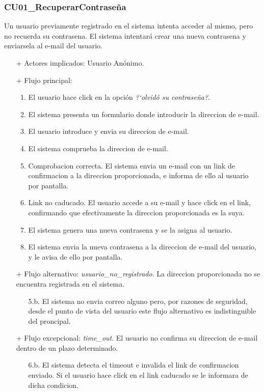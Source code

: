 \documentclass[a4paper]{report}
\begin{document}
            \subsubsection{CU01\_RecuperarContrase\~na}
                Un usuario previamente registrado en el sistema intenta acceder al mismo, pero no recuerda su contrasena. El sistema intentar\'a crear una nueva contrasena y enviarsela al e-mail del usuario.
                \begin{itemize}
                    \item[+] Actores implicados: Usuario An\'onimo.
                    \item[+] Flujo principal:
                    \begin{enumerate}
                        \item El usuario hace click en la opci\'on \emph{?`olvid\'o su contrase\~na?}.
                        \item El sistema presenta un formulario donde introducir la direccion de e-mail.
                        \item El usuario introduce y envia su direccion de e-mail.
                        \item El sistema comprueba la direccion de e-mail.
                        \item Comprobacion correcta. El sistema envia un e-mail con un link de confirmacion a la direccion proporcionada, e informa de ello al usuario por pantalla.
                        \item Link no caducado. El usuario accede a su e-mail y hace click en el link, confirmando que efectivamente la direccion proporcionada es la suya.
                        \item El sistema genera una nueva contrasena y se la asigna al usuario.
                        \item El sistema envia la nueva contrasena a la direccion de e-mail del usuario, y le avisa de ello por pantalla.
                    \end{enumerate}
                    \item[+] Flujo alternativo: \emph{usuario\_no\_registrado}. La direccion proporcionada no se encuentra registrada en el sistema.
                    \begin{itemize}
                        \item[5.b.] El sistema no envia correo alguno pero, por razones de seguridad, desde el punto de vista del usuario este flujo alternativo es indistinguible del proncipal.
                    \end{itemize}
                    \item[+] Flujo excepcional: \emph{time\_out}. El usuario no confirma su direccion de e-mail dentro de un plazo determinado.
                    \begin{itemize}
                        \item[6.b.] El sistema detecta el timeout e invalida el link de confirmacion enviado. Si el usuario hace click en el link caducado se le informara de dicha condicion.
                    \end{itemize}
                \end{itemize}
\end{document}

